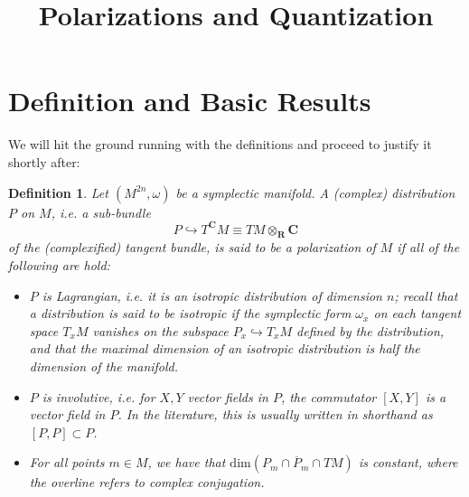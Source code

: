 \documentclass{tufte-handout}
\title{Polarizations and Quantization}
\newtheorem{defn}{Definition}
\begin{document}
\section{Definition and Basic Results}

We will hit the ground running with the definitions and proceed to justify it shortly after:

\begin{defn}
Let $(M^{2n},\omega)$ be a symplectic manifold. A (complex) distribution $P$ on $M$, i.e. a sub-bundle
$$
P \hookrightarrow T^{\mathbf{C}}M \equiv TM \otimes_{\mathbf{R}} \mathbf{C}
$$
of the (complexified) tangent bundle, is said to be a \emph{polarization} of $M$ if all of the following are hold:
\begin{itemize}
\item $P$ is \emph{Lagrangian}, i.e. it is an \emph{isotropic} distribution of dimension $n$; recall that a distribution is said to be isotropic if the symplectic form $\omega_x$ on each tangent space $T_xM$ vanishes on the subspace $P_x \hookrightarrow T_xM$ defined by the distribution, and that the maximal dimension of an isotropic distribution is half the dimension of the manifold.

\item $P$ is \emph{involutive}, i.e. for $X,Y$ vector fields in $P$, the commutator $[X,Y]$ is a vector field in $P$. In the literature, this is usually written in shorthand as $[P,P] \subset P$.

\item For all points $m \in M$, we have that $\mathrm{dim}(P_m \cap \overline{P}_m \cap TM)$ is constant, where the overline refers to complex conjugation.

\end{itemize}
\end{defn}
\end{document}
